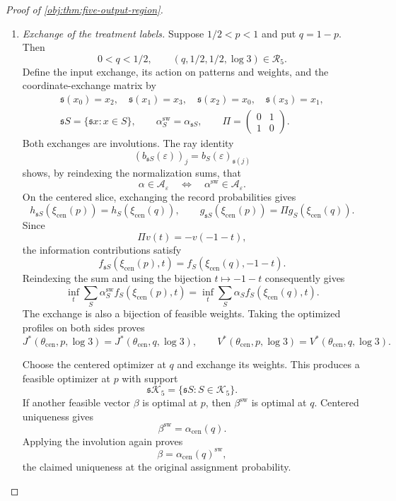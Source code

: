 \documentclass[11pt]{article}
\begin{document}
\begin{proof}[Proof of \cref{obj:thm:five-output-region}]
\begin{enumerate}
\item \textit{Exchange of the treatment labels.}
Suppose \(1/2<p<1\) and put \(q=1-p\). Then
\[
0<q<1/2,
\qquad
(q,1/2,1/2,\log3)\in\mathcal R_5.
\]
Define the input exchange, its action on patterns and weights, and the
coordinate-exchange matrix by
\[
\begin{gathered}
\mathfrak s(x_0)=x_2,\quad
\mathfrak s(x_1)=x_3,\quad
\mathfrak s(x_2)=x_0,\quad
\mathfrak s(x_3)=x_1,\\
\mathfrak s S=\{\mathfrak s x:x\in S\},\qquad
\alpha^{\mathrm{sw}}_S=\alpha_{\mathfrak s S},\qquad
\Pi=\begin{pmatrix}0&1\\1&0\end{pmatrix}.
\end{gathered}
\]
Both exchanges are involutions. The ray identity
\[
(b_{\mathfrak s S}(\varepsilon))_j
=b_S(\varepsilon)_{\mathfrak s(j)}
\]
shows, by reindexing the normalization sums, that
\[
\alpha\in\mathcal A_\varepsilon
\quad\Longleftrightarrow\quad
\alpha^{\mathrm{sw}}\in\mathcal A_\varepsilon.
\]
On the centered slice, exchanging the record probabilities gives
\[
h_{\mathfrak s S}(\xi_{\mathrm{cen}}(p))
=h_S(\xi_{\mathrm{cen}}(q)),
\qquad
g_{\mathfrak s S}(\xi_{\mathrm{cen}}(p))
=\Pi g_S(\xi_{\mathrm{cen}}(q)).
\]
Since
\[
\Pi v(t)=-v(-1-t),
\]
the information contributions satisfy
\[
f_{\mathfrak s S}(\xi_{\mathrm{cen}}(p),t)
=
f_S(\xi_{\mathrm{cen}}(q),-1-t).
\]
Reindexing the sum and using the bijection \(t\mapsto-1-t\) consequently
gives
\[
\inf_t\sum_S\alpha^{\mathrm{sw}}_S
 f_S(\xi_{\mathrm{cen}}(p),t)
=
\inf_t\sum_S\alpha_S f_S(\xi_{\mathrm{cen}}(q),t).
\]
The exchange is also a bijection of feasible weights. Taking the
optimized profiles on both sides proves
\[
J^*(\theta_{\mathrm{cen}},p,\log3)
=
J^*(\theta_{\mathrm{cen}},q,\log3),
\qquad
V^*(\theta_{\mathrm{cen}},p,\log3)
=
V^*(\theta_{\mathrm{cen}},q,\log3).
\]

Choose the centered optimizer at \(q\) and exchange its weights. This
produces a feasible optimizer at \(p\) with support
\[
\mathfrak s\mathcal K_5=\{\mathfrak s S:S\in\mathcal K_5\}.
\]
If another feasible vector \(\beta\) is optimal at \(p\), then
\(\beta^{\mathrm{sw}}\) is optimal at \(q\). Centered uniqueness gives
\[
\beta^{\mathrm{sw}}=\alpha_{\mathrm{cen}}(q).
\]
Applying the involution again proves
\[
\beta=\alpha_{\mathrm{cen}}(q)^{\mathrm{sw}},
\]
the claimed uniqueness at the original assignment probability.


\end{enumerate}
\end{proof}
\end{document}
